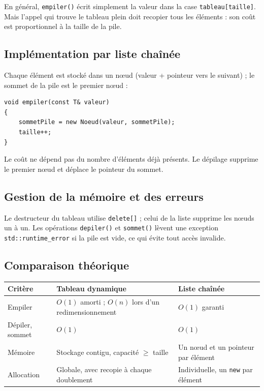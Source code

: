 \documentclass[11pt,a4paper]{article}
\begin{document}
En général, \texttt{empiler()} écrit simplement la valeur dans la case \texttt{tableau[taille]}. Mais l'appel qui trouve le tableau plein doit recopier tous les éléments : son coût est proportionnel à la taille de la pile.

\subsection{Implémentation par liste chaînée}

Chaque élément est stocké dans un nœud (valeur + pointeur vers le suivant) ; le sommet de la pile est le premier nœud :

\begin{lstlisting}
void empiler(const T& valeur)
{
    sommetPile = new Noeud(valeur, sommetPile);
    taille++;
}
\end{lstlisting}

Le coût ne dépend pas du nombre d'éléments déjà présents. Le dépilage supprime le premier nœud et déplace le pointeur du sommet.

\subsection{Gestion de la mémoire et des erreurs}

Le destructeur du tableau utilise \texttt{delete[]} ; celui de la liste supprime les nœuds un à un. Les opérations \texttt{depiler()} et \texttt{sommet()} lèvent une exception \texttt{std::runtime\_error} si la pile est vide, ce qui évite tout accès invalide.

\subsection{Comparaison théorique}

\begin{center}
\renewcommand{\arraystretch}{1.25}
\begin{tabularx}{\textwidth}{@{}l X X@{}}
\toprule
\textbf{Critère} & \textbf{Tableau dynamique} & \textbf{Liste chaînée} \\
\midrule
Empiler & $O(1)$ amorti ; $O(n)$ lors d'un redimensionnement & $O(1)$ garanti \\
Dépiler, sommet & $O(1)$ & $O(1)$ \\
Mémoire & Stockage contigu, capacité $\geq$ taille & Un nœud et un pointeur par élément \\
Allocation & Globale, avec recopie à chaque doublement & Individuelle, un \texttt{new} par élément \\
\bottomrule
\end{tabularx}
\end{center}
\end{document}
